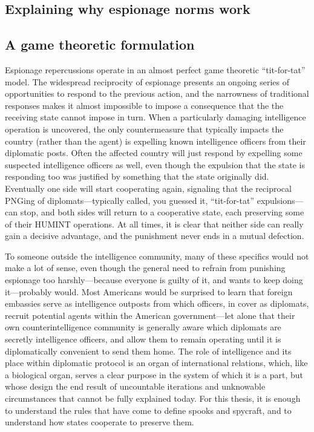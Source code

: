 \documentclass{memoir}
\begin{document}
\begin{refsegment}

\section{Explaining why espionage norms work}
\subsection{A game theoretic formulation}
Espionage repercussions operate in an almost perfect game theoretic ``tit-for-tat'' model. The widespread reciprocity of espionage presents an ongoing series of opportunities to respond to the previous action, and the narrowness of traditional responses makes it almost impossible to impose a consequence that the the receiving state cannot impose in turn. When a particularly damaging intelligence operation is uncovered, the only countermeasure that typically impacts the country (rather than the agent) is expelling known intelligence officers from their diplomatic posts. Often the affected country will just respond by expelling some suspected intelligence officers as well, even though the expulsion that the state is responding too was justified by something that the state originally did. Eventually one side will start cooperating again, signaling that the reciprocal PNGing of diplomats---typically called, you guessed it, ``tit-for-tat'' expulsions---can stop, and both sides will return to a cooperative state, each preserving some of their HUMINT operations. At all times, it is clear that neither side can really gain a decisive advantage, and the punishment never ends in a mutual defection.

To someone outside the intelligence community, many of these specifics would not make a lot of sense, even though the general need to refrain from punishing espionage too harshly---because everyone is guilty of it, and wants to keep doing it---probably would. Most Americans would be surprised to learn that foreign embassies serve as intelligence outposts from which officers, in cover as diplomats, recruit potential agents within the American government---let alone that their own counterintelligence community is generally aware which diplomats are secretly intelligence officers, and allow them to remain operating until it is diplomatically convenient to send them home. The role of intelligence and its place within diplomatic protocol is an organ of international relations, which, like a biological organ, serves a clear purpose in the system of which it is a part, but whose design the end result of uncountable iterations and unknowable circumstances that cannot be fully explained today. For this thesis, it is enough to understand the rules that have come to define spooks and spycraft, and to understand how states cooperate to preserve them.


\end{refsegment}
\end{document}
